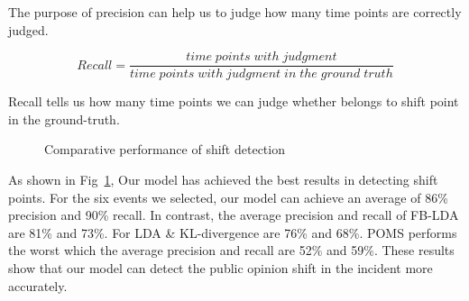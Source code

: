 \documentclass[runningheads]{llncs}
\begin{document}
The purpose of precision can help us to judge how many time points are correctly judged.

\begin{equation}
    Recall = \frac{time\;points\;with\;judgment}{time\;points\;with\;judgment\;in\;the\;ground\;truth}
\end{equation}

Recall tells us how many time points we can judge whether belongs to shift point in the ground-truth.

\vspace{-0.6cm}
\begin{figure}
\centering
{}
\hspace{-4ex}
\setlength{\abovecaptionskip}{-0.1cm}
\caption{Comparative performance of shift detection}\label{fig:shift}
\end{figure}


As shown in Fig~\ref{fig:shift}, Our model has achieved the best results in detecting shift points. For the six events we selected, our model can achieve an average of 86\% precision and 90\% recall. In contrast, the average precision and recall of FB-LDA are 81\% and 73\%. For LDA \& KL-divergence are 76\% and 68\%. POMS performs the worst which the average precision and recall are 52\% and 59\%. These results show that our model can detect the public opinion shift in the incident more accurately.
\end{document}
